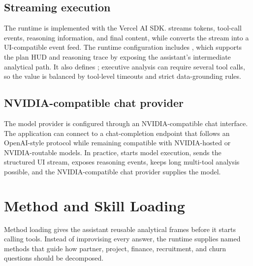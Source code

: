 \subsection{Streaming execution}
The runtime is implemented with the Vercel AI SDK.  streams tokens, tool-call events, reasoning information, and final content, while  converts the stream into a UI-compatible event feed. The runtime configuration includes , which supports the plan HUD and reasoning trace by exposing the assistant's intermediate analytical path. It also defines ; executive analysis can require several tool calls, so the value is balanced by tool-level timeouts and strict data-grounding rules.
\subsection{NVIDIA-compatible chat provider}
The model provider is configured through an NVIDIA-compatible chat interface. The application can connect to a chat-completion endpoint that follows an OpenAI-style protocol while remaining compatible with NVIDIA-hosted or NVIDIA-routable models. In practice,  starts model execution,  sends the structured UI stream,  exposes reasoning events,  keeps long multi-tool analysis possible, and the NVIDIA-compatible chat provider supplies the model.
\section{Method and Skill Loading}
Method loading gives the assistant reusable analytical frames before it starts calling tools. Instead of improvising every answer, the runtime supplies named methods that guide how partner, project, finance, recruitment, and churn questions should be decomposed.
